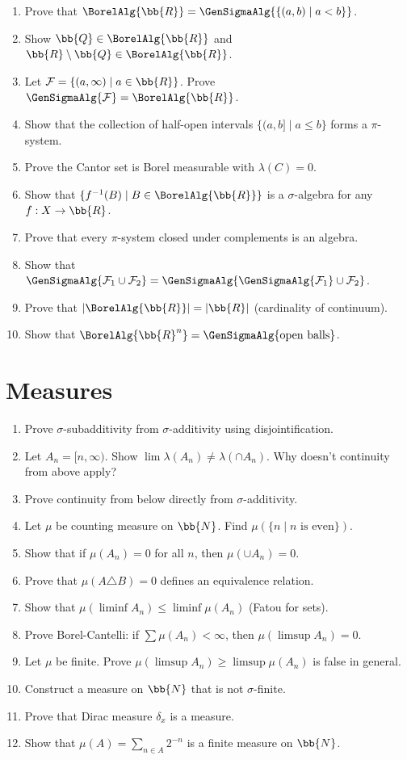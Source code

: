 \begin{enumerate}
    \item Prove that $\BorelAlg{\bb{R}} = \GenSigmaAlg{\{(a,b) \mid a < b\}}$.
    \item Show $\bb{Q} \in \BorelAlg{\bb{R}}$ and $\bb{R} \setminus \bb{Q} \in \BorelAlg{\bb{R}}$.
    \item Let $\mathcal{F} = \{(a, \infty) \mid a \in \bb{R}\}$. Prove $\GenSigmaAlg{\mathcal{F}} = \BorelAlg{\bb{R}}$.
    \item Show that the collection of half-open intervals $\{(a, b] \mid a \leq b\}$ forms a $\pi$-system.
    \item Prove the Cantor set is Borel measurable with $\lambda(C) = 0$.
    \item Show that $\{f^{-1}(B) \mid B \in \BorelAlg{\bb{R}}\}$ is a $\sigma$-algebra for any $f: X \to \bb{R}$.
    \item Prove that every $\pi$-system closed under complements is an algebra.
    \item Show that $\GenSigmaAlg{\mathcal{F}_1 \cup \mathcal{F}_2} = \GenSigmaAlg{\GenSigmaAlg{\mathcal{F}_1} \cup \mathcal{F}_2}$.
    \item Prove that $|\BorelAlg{\bb{R}}| = |\bb{R}|$ (cardinality of continuum).
    \item Show that $\BorelAlg{\bb{R}^n} = \GenSigmaAlg{\text{open balls}}$.
\end{enumerate}

\section{Measures}

\begin{enumerate}
    \item Prove $\sigma$-subadditivity from $\sigma$-additivity using disjointification.
    \item Let $A_n = [n, \infty)$. Show $\lim \lambda(A_n) \neq \lambda(\cap A_n)$. Why doesn't continuity from above apply?
    \item Prove continuity from below directly from $\sigma$-additivity.
    \item Let $\mu$ be counting measure on $\bb{N}$. Find $\mu(\{n \mid n \text{ is even}\})$.
    \item Show that if $\mu(A_n) = 0$ for all $n$, then $\mu(\cup A_n) = 0$.
    \item Prove that $\mu(A \triangle B) = 0$ defines an equivalence relation.
    \item Show that $\mu(\liminf A_n) \leq \liminf \mu(A_n)$ (Fatou for sets).
    \item Prove Borel-Cantelli: if $\sum \mu(A_n) < \infty$, then $\mu(\limsup A_n) = 0$.
    \item Let $\mu$ be finite. Prove $\mu(\limsup A_n) \geq \limsup \mu(A_n)$ is false in general.
    \item Construct a measure on $\bb{N}$ that is not $\sigma$-finite.
    \item Prove that Dirac measure $\delta_x$ is a measure.
    \item Show that $\mu(A) = \sum_{n \in A} 2^{-n}$ is a finite measure on $\bb{N}$.
\end{enumerate}

